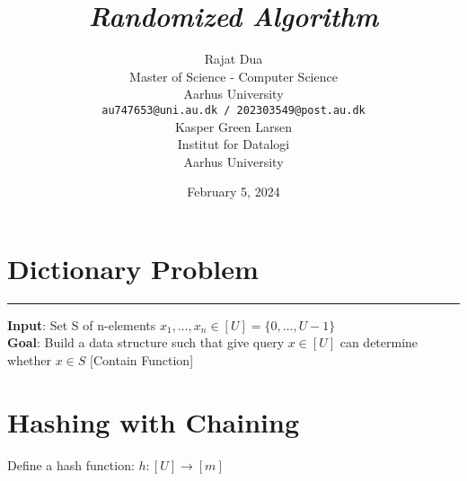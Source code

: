 \documentclass{article}
\title{\emph{Randomized Algorithm}}
\author{{\hspace{1mm}Rajat Dua} \\
	Master of Science - Computer Science\\
	Aarhus University\\
	\texttt{au747653@uni.au.dk / 202303549@post.au.dk} \\
	\And
	{\hspace{1mm}Kasper Green Larsen} \\
	Institut for Datalogi\\
	Aarhus University\\
}
\date{February 5, 2024}
\begin{document}
\maketitle
\vspace{-1cm}
\section{Dictionary Problem}
\hrule

\textbf{Input}: Set S of n-elements $x_1, \ldots, x_n \in [U] = \{0, \ldots, U-1 \}$  \\
\textbf{Goal}: Build a data structure such that give query $x \in [U]$ can determine whether $x \in S$ [Contain Function]

\section{Hashing with Chaining}

Define a hash function: $h:[U] \rightarrow [m]$
\end{document}
